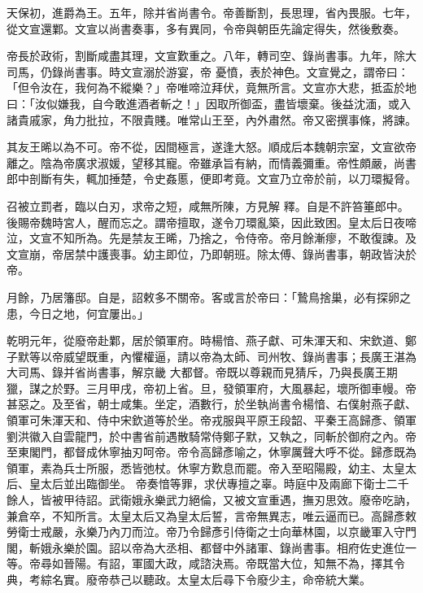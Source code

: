 \begin{pinyinscope}
 天保初，進爵為王。五年，除并省尚書令。帝善斷割，長思理，省內畏服。七年，從文宣還鄴。文宣以尚書奏事，多有異同，令帝與朝臣先論定得失，然後敷奏。



 帝長於政術，割斷咸盡其理，文宣歎重之。八年，轉司空、錄尚書事。九年，除大司馬，仍錄尚書事。時文宣溺於游宴，帝
 憂憤，表於神色。文宣覺之，謂帝曰：「但令汝在，我何為不縱樂？」帝唯啼泣拜伏，竟無所言。文宣亦大悲，抵盃於地曰：「汝似嫌我，自今敢進酒者斬之！」因取所御盃，盡皆壞棄。後益沈湎，或入諸貴戚家，角力批拉，不限貴賤。唯常山王至，內外肅然。帝又密撰事條，將諫。



 其友王晞以為不可。帝不從，因間極言，遂逢大怒。順成后本魏朝宗室，文宣欲帝離之。陰為帝廣求淑媛，望移其寵。帝雖承旨有納，而情義彌重。帝性頗嚴，尚書郎中剖斷有失，輒加捶楚，令史姦慝，便即考竟。文宣乃立帝於前，以刀環擬脅。



 召被立罰者，臨以白刃，求帝之短，咸無所陳，方見解
 釋。自是不許笞箠郎中。後賜帝魏時宮人，醒而忘之。謂帝擅取，遂令刀環亂築，因此致困。皇太后日夜啼泣，文宣不知所為。先是禁友王晞，乃捨之，令侍帝。帝月餘漸瘳，不敢復諫。及文宣崩，帝居禁中護喪事。幼主即位，乃即朝班。除太傅、錄尚書事，朝政皆決於帝。



 月餘，乃居籓邸。自是，詔敕多不關帝。客或言於帝曰：「鷙鳥捨巢，必有探卵之患，今日之地，何宜屢出。」



 乾明元年，從廢帝赴鄴，居於領軍府。時楊愔、燕子獻、可朱渾天和、宋欽道、鄭子默等以帝威望既重，內懼權逼，請以帝為太師、司州牧、錄尚書事；長廣王湛為大司馬、錄并省尚書事，解京畿
 大都督。帝既以尊親而見猜斥，乃與長廣王期獵，謀之於野。三月甲戌，帝初上省。旦，發領軍府，大風暴起，壞所御車幔。帝甚惡之。及至省，朝士咸集。坐定，酒數行，於坐執尚書令楊愔、右僕射燕子獻、領軍可朱渾天和、侍中宋欽道等於坐。帝戎服與平原王段韶、平秦王高歸彥、領軍劉洪徽入自雲龍門，於中書省前遇散騎常侍鄭子默，又執之，同斬於御府之內。帝至東閣門，都督成休寧抽刃呵帝。帝令高歸彥喻之，休寧厲聲大呼不從。歸彥既為領軍，素為兵士所服，悉皆弛杖。休寧方歎息而罷。帝入至昭陽殿，幼主、太皇太后、皇太后並出臨御坐。
 帝奏愔等罪，求伏專擅之辜。時庭中及兩廊下衛士二千餘人，皆被甲待詔。武衛娥永樂武力絕倫，又被文宣重遇，撫刃思效。廢帝吃訥，兼倉卒，不知所言。太皇太后又為皇太后誓，言帝無異志，唯云逼而已。高歸彥敕勞衛士戒嚴，永樂乃內刀而泣。帝乃令歸彥引侍衛之士向華林園，以京畿軍入守門閣，斬娥永樂於園。詔以帝為大丞相、都督中外諸軍、錄尚書事。相府佐史進位一等。帝尋如晉陽。有詔，軍國大政，咸諮決焉。帝既當大位，知無不為，擇其令典，考綜名實。廢帝恭己以聽政。太皇太后尋下令廢少主，命帝統大業。




\end{pinyinscope}

